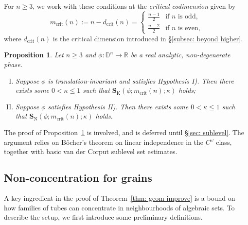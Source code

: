 \documentclass[reqno]{amsart}
\numberwithin{equation}{section}
\newcommand{\D}{\mathbb{D}}
\newcommand{\R}{\mathbb{R}}
\newcommand{\bS}{\mathbf{S}}
\theoremstyle{plain}
\newtheorem{proposition}[theorem]{Proposition}
\theoremstyle{definition}
\newcommand{\tK}{\mathrm{K}}
\newcommand{\tN}{\mathrm{N}}
\newcommand{\crit}{\mathrm{crit}}
\begin{document}
For $n \geq 3$, we work with these conditions at the \textit{critical codimension} given by
\begin{equation}\label{eq: crit codim}
    m_{\crit}(n) := n - d_{\crit}(n) =
    \begin{cases}
        \frac{n-1}{2} & \textrm{if $n$ is odd,} \\
        \frac{n-2}{2} & \textrm{if $n$ is even,}
    \end{cases}
\end{equation}
where $d_{\crit}(n)$ is the critical dimension introduced in \S\ref{subsec: beyond higher}. 


\begin{proposition}\label{prop: hyp K N} Let $n \geq 3$ and $\phi \colon \D^n \to \R$ be a real analytic, non-degenerate phase. 
\begin{enumerate}[I)]
    \item Suppose $\phi$ is translation-invariant and satisfies Hypothesis I). Then there exists some $0 < \kappa \leq 1$ such that $\bS_{\tK}(\phi; m_{\crit}(n); \kappa)$ holds; 
    \item Suppose $\phi$ satisfies Hypothesis II). Then there exists some $0 < \kappa \leq 1$ such that $\bS_{\tN}(\phi;m_{\crit}(n); \kappa)$ holds.
\end{enumerate}
\end{proposition}

The proof of Proposition~\ref{prop: hyp K N} is involved, and is deferred until \S\ref{sec: sublevel}. The argument relies on B\^ocher's theorem \cite{Bocher1900} on linear independence in the $C^{\omega}$ class, together with basic van der Corput sublevel set estimates.  





\subsection{Non-concentration for grains}\label{subsec: non concentration grains}

A key ingredient in the proof of Theorem~\ref{thm: geom improve} is a bound on how families of tubes can concentrate in neighbourhoods of algebraic sets. To describe the setup, we first introduce some preliminary definitions. 
\end{document}
